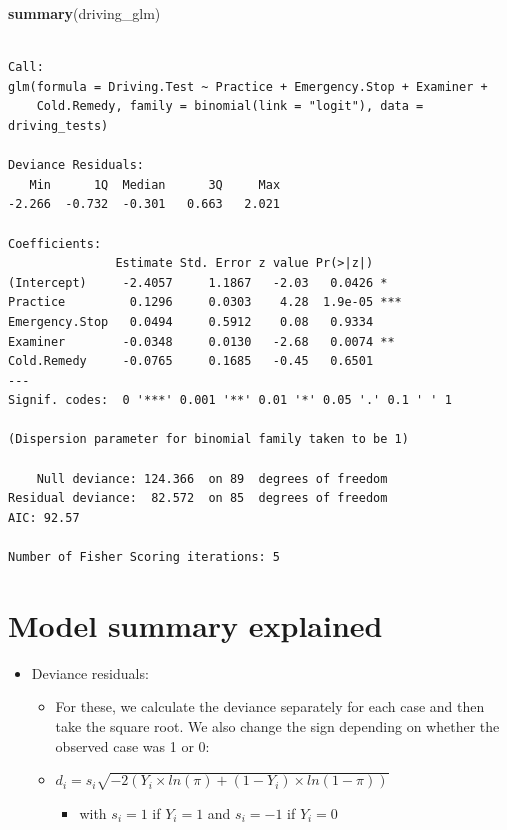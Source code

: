 \documentclass[]{article}
\newenvironment{Shaded}{}{}
\newcommand{\KeywordTok}[1]{\textcolor[rgb]{0.00,0.44,0.13}{\textbf{{#1}}}}
\newcommand{\NormalTok}[1]{{#1}}
\begin{document}
\begin{Shaded}
\begin{Highlighting}[]
\KeywordTok{summary}\NormalTok{(driving_glm)}
\end{Highlighting}
\end{Shaded}

\begin{verbatim}

Call:
glm(formula = Driving.Test ~ Practice + Emergency.Stop + Examiner + 
    Cold.Remedy, family = binomial(link = "logit"), data = driving_tests)

Deviance Residuals: 
   Min      1Q  Median      3Q     Max  
-2.266  -0.732  -0.301   0.663   2.021  

Coefficients:
               Estimate Std. Error z value Pr(>|z|)    
(Intercept)     -2.4057     1.1867   -2.03   0.0426 *  
Practice         0.1296     0.0303    4.28  1.9e-05 ***
Emergency.Stop   0.0494     0.5912    0.08   0.9334    
Examiner        -0.0348     0.0130   -2.68   0.0074 ** 
Cold.Remedy     -0.0765     0.1685   -0.45   0.6501    
---
Signif. codes:  0 '***' 0.001 '**' 0.01 '*' 0.05 '.' 0.1 ' ' 1

(Dispersion parameter for binomial family taken to be 1)

    Null deviance: 124.366  on 89  degrees of freedom
Residual deviance:  82.572  on 85  degrees of freedom
AIC: 92.57

Number of Fisher Scoring iterations: 5
\end{verbatim}

\section{Model summary explained}\label{model-summary-explained}

\begin{itemize}
\itemsep1pt\parskip0pt
\item
  Deviance residuals:

  \begin{itemize}
  \itemsep1pt\parskip0pt
  \item
    For these, we calculate the deviance separately for each case and
    then take the square root. We also change the sign depending on
    whether the observed case was 1 or 0:
  \item
    $d_i = s_i \sqrt{-2(Y_i\times ln(\pi) + (1-Y_i)\times ln(1-\pi))}$

    \begin{itemize}
    \itemsep1pt\parskip0pt
    \item
      with $s_i = 1$ if $Y_i = 1$ and $s_i = -1$ if $Y_i = 0$
    \end{itemize}
  \end{itemize}
\end{itemize}
\end{document}
